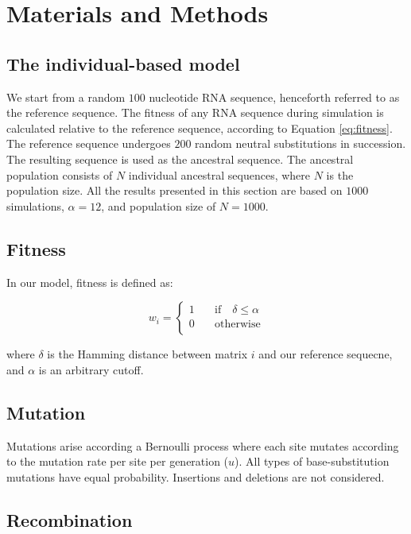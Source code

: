 \documentclass[9pt,lineno]{elife}
\begin{document}
\section*{Materials and Methods}

\subsection{The individual-based model}

We start from a random $100$ nucleotide RNA sequence, henceforth referred to as the reference sequence. The fitness of any RNA sequence during simulation is calculated relative to the reference sequence, according to Equation \ref{eq:fitness}. The reference sequence undergoes $200$ random neutral substitutions in succession. The resulting sequence is used as the ancestral sequence. The ancestral population consists of $N$ individual ancestral sequences, where $N$ is the population size. All the results presented in this section are based on $1000$ simulations, $\alpha = 12$, and population size of $N=1000$.

\subsection{Fitness} 

In our model, fitness is defined as:

\begin{equation}
	w_{i} = \left\{\begin{array}{ll}
    		1 & \quad  \mathrm{if}  \quad  \delta \leqslant \alpha\\
			0 & \quad  \mathrm{otherwise}   \\
			\end{array}\right.
\label{eq:fitness}
\end{equation} 

where $\delta$ is the Hamming distance between matrix $i$ and our reference sequecne, and $\alpha$ is an arbitrary cutoff.

\subsection{Mutation}

Mutations arise according a Bernoulli process where each site mutates according to the mutation rate per site per generation ($u$). All types of base-substitution mutations have equal probability.  Insertions and deletions are not considered.

\subsection{Recombination}
\end{document}
